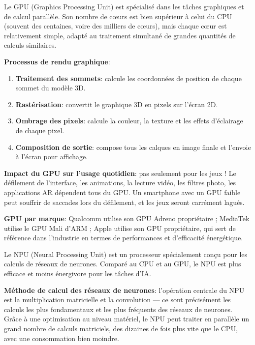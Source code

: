 
Le GPU (Graphics Processing Unit) est spécialisé dans les tâches graphiques et de calcul parallèle. Son nombre de cœurs est bien supérieur à celui du CPU (souvent des centaines, voire des milliers de cœurs), mais chaque cœur est relativement simple, adapté au traitement simultané de grandes quantités de calculs similaires.

\textbf{Processus de rendu graphique}:

\begin{enumerate}
  \item \textbf{Traitement des sommets}: calcule les coordonnées de position de chaque sommet du modèle 3D.
  \item \textbf{Rastérisation}: convertit le graphique 3D en pixels sur l'écran 2D.
  \item \textbf{Ombrage des pixels}: calcule la couleur, la texture et les effets d'éclairage de chaque pixel.
  \item \textbf{Composition de sortie}: compose tous les calques en image finale et l'envoie à l'écran pour affichage.
\end{enumerate}

\textbf{Impact du GPU sur l'usage quotidien}: pas seulement pour les jeux ! Le défilement de l'interface, les animations, la lecture vidéo, les filtres photo, les applications AR dépendent tous du GPU. Un smartphone avec un GPU faible peut souffrir de saccades lors du défilement, et les jeux seront carrément lagués.

\textbf{GPU par marque}: Qualcomm utilise son GPU Adreno propriétaire ; MediaTek utilise le GPU Mali d'ARM ; Apple utilise son GPU propriétaire, qui sert de référence dans l'industrie en termes de performances et d'efficacité énergétique.


Le NPU (Neural Processing Unit) est un processeur spécialement conçu pour les calculs de réseaux de neurones. Comparé au CPU et au GPU, le NPU est plus efficace et moins énergivore pour les tâches d'IA.

\textbf{Méthode de calcul des réseaux de neurones}: l'opération centrale du NPU est la multiplication matricielle et la convolution — ce sont précisément les calculs les plus fondamentaux et les plus fréquents des réseaux de neurones. Grâce à une optimisation au niveau matériel, le NPU peut traiter en parallèle un grand nombre de calculs matriciels, des dizaines de fois plus vite que le CPU, avec une consommation bien moindre.


